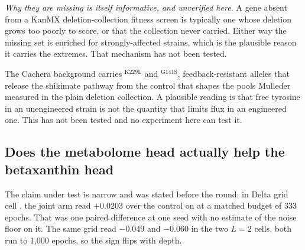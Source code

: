 \emph{Why they are missing is itself informative, and unverified here.} A gene absent from a
KanMX deletion-collection fitness screen is typically one whose deletion grows too poorly to
score, or that the collection never carried. Either way the missing set is enriched for
strongly-affected strains, which is the plausible reason it carries the extremes. That
mechanism has not been tested.


 The Cachera background carries
$^{\mathrm{K229L}}$ and $^{\mathrm{G141S}}$, feedback-resistant
alleles that release the shikimate pathway from the control that shapes the pools Mulleder
measured in the plain deletion collection. A plausible reading is that free tyrosine in an
unengineered strain is not the quantity that limits flux in an engineered one. This has not
been tested and no experiment here can test it.

\subsection{Does the metabolome head actually help the betaxanthin head}

The claim under test is narrow and was stated before the round: in Delta grid cell
, the joint arm read $+0.0203$ over the control on
 at a matched budget of 333 epochs. That was
one paired difference at one seed with no estimate of the noise floor on it. The same grid
read $-0.049$ and $-0.060$ in the two $L = 2$ cells, both run to 1,000 epochs, so the sign
flips with depth.



